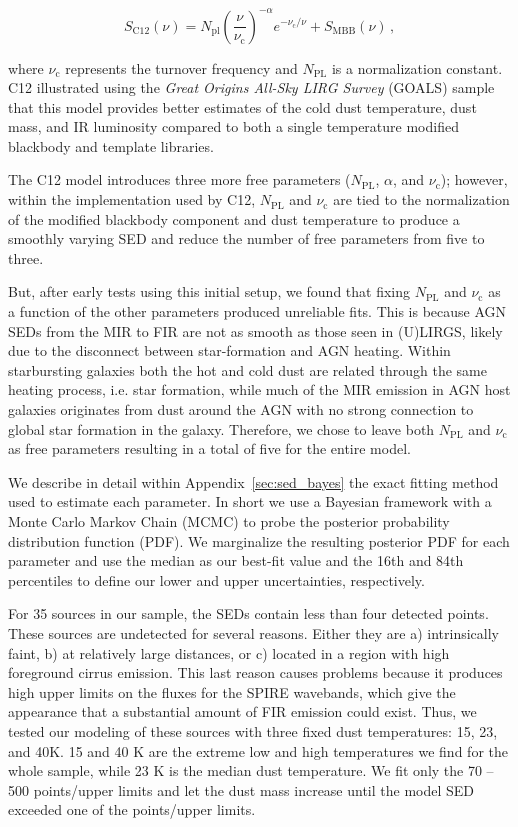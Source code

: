 \documentclass[fleqn, usenatbib]{mnras}
\begin{document}
\begin{equation}\label{eq:casey}
S_{\mathrm{C12}}(\nu) = N_{\mathrm{pl}}\left(\frac{\nu}{\nu_{\mathrm{c}}}\right)^{-\alpha}e^{-\nu_{\mathrm{c}}/\nu} + S_{\mathrm{MBB}}(\nu)\,,
\end{equation}

\noindent where $\nu_{\mathrm{c}}$ represents the turnover frequency and $N_{\mathrm{PL}}$ is a normalization constant. C12 illustrated using the \textit{Great Origins All-Sky LIRG Survey} (GOALS) sample that this model provides better estimates of the cold dust temperature, dust mass, and IR luminosity compared to both a single temperature modified blackbody and template libraries.

The C12 model introduces three more free parameters ($N_{\mathrm{PL}}$, $\alpha$, and $\nu_{\mathrm{c}}$); however, within the implementation used by C12, $N_{\mathrm{PL}}$ and $\nu_{\mathrm{c}}$ are tied to the normalization of the modified blackbody component and dust temperature to produce a smoothly varying SED and reduce the number of free parameters from five to three. 

But, after early tests using this initial setup, we found that fixing $N_{\mathrm{PL}}$ and $\nu_{\mathrm{c}}$ as a function of the other parameters produced unreliable fits. This is because AGN SEDs from the MIR to FIR are not as smooth as those seen in (U)LIRGS, likely due to the disconnect between star-formation and AGN heating. Within starbursting galaxies both the hot and cold dust are related through the same heating process, i.e. star formation, while much of the MIR emission in AGN host galaxies originates from dust around the AGN with no strong connection to global star formation in the galaxy. Therefore, we chose to leave both $N_{\mathrm{PL}}$ and $\nu_{\mathrm{c}}$ as free parameters resulting in a total of five for the entire model.

We describe in detail within Appendix~\ref{sec:sed_bayes} the exact fitting method used to estimate each parameter. In short we use a Bayesian framework with a Monte Carlo Markov Chain (MCMC) to probe the posterior probability distribution function (PDF). We marginalize the resulting posterior PDF for each parameter and use the median as our best-fit value and the 16th and 84th percentiles to define our lower and upper uncertainties, respectively. 

{\color{red}For 35 sources in our sample, the SEDs contain less than four detected points.} These sources are undetected for several reasons. Either they are a) intrinsically faint, b) at relatively large distances, or c) located in a region with high foreground cirrus emission. This last reason causes problems because it produces high upper limits on the fluxes for the SPIRE wavebands, which give the appearance that a substantial amount of FIR emission could exist. Thus, we tested our modeling of these sources with three fixed dust temperatures: 15, 23, and 40K. 15 and 40 K are the extreme low and high temperatures we find for the whole sample, while 23 K is the median dust temperature. We fit only the 70 -- 500 \micron{} points/upper limits and let the dust mass increase until the model SED exceeded one of the points/upper limits. 
\end{document}
